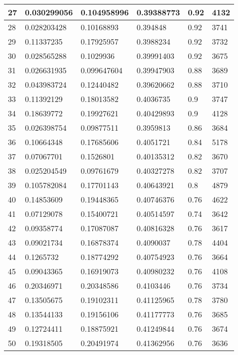 \begin{longtable}{|l|l|l|l|l|l|}
27 & 0.030299056 & 0.104958996 & 0.39388773 & 0.92 & 4132 \\ \hline 
28 & 0.028203428 & 0.10168893 & 0.394848 & 0.92 & 3741 \\ \hline 
29 & 0.11337235 & 0.17925957 & 0.3988234 & 0.92 & 3732 \\ \hline 
30 & 0.028565288 & 0.1029936 & 0.39991403 & 0.92 & 3675 \\ \hline 
31 & 0.026631935 & 0.099647604 & 0.39947903 & 0.88 & 3689 \\ \hline 
32 & 0.043983724 & 0.12440482 & 0.39620662 & 0.88 & 3710 \\ \hline 
33 & 0.11392129 & 0.18013582 & 0.4036735 & 0.9 & 3747 \\ \hline 
34 & 0.18639772 & 0.19927621 & 0.40429893 & 0.9 & 4128 \\ \hline 
35 & 0.026398754 & 0.09877511 & 0.3959813 & 0.86 & 3684 \\ \hline 
36 & 0.10664348 & 0.17685606 & 0.4051721 & 0.84 & 5178 \\ \hline 
37 & 0.07067701 & 0.1526801 & 0.40135312 & 0.82 & 3670 \\ \hline 
38 & 0.025204549 & 0.09761679 & 0.40327278 & 0.82 & 3707 \\ \hline 
39 & 0.105782084 & 0.17701143 & 0.40643921 & 0.8 & 4879 \\ \hline 
40 & 0.14853609 & 0.19448365 & 0.40746376 & 0.76 & 4622 \\ \hline 
41 & 0.07129078 & 0.15400721 & 0.40514597 & 0.74 & 3642 \\ \hline 
42 & 0.09358774 & 0.17087087 & 0.40816328 & 0.76 & 3617 \\ \hline 
43 & 0.09021734 & 0.16878374 & 0.4090037 & 0.78 & 4404 \\ \hline 
44 & 0.1265732 & 0.18774292 & 0.40754923 & 0.76 & 3664 \\ \hline 
45 & 0.09043365 & 0.16919073 & 0.40980232 & 0.76 & 4108 \\ \hline 
46 & 0.20346971 & 0.20348586 & 0.4103446 & 0.76 & 3734 \\ \hline 
47 & 0.13505675 & 0.19102311 & 0.41125965 & 0.78 & 3780 \\ \hline 
48 & 0.13544133 & 0.19156106 & 0.41177773 & 0.76 & 3685 \\ \hline 
49 & 0.12724411 & 0.18875921 & 0.41249844 & 0.76 & 3674 \\ \hline 
50 & 0.19318505 & 0.20491974 & 0.41362956 & 0.76 & 3636 \\ \hline 
\end{longtable}